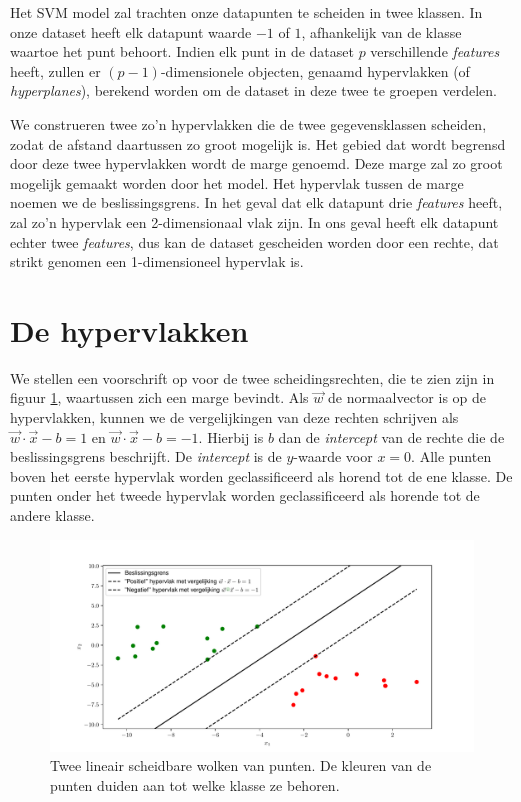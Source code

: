 \documentclass[twoside, kulak]{kulakreport}
\begin{document}
	Het SVM model zal trachten onze datapunten te scheiden in twee klassen. In onze dataset heeft elk datapunt waarde \(-1\) of \(1\), afhankelijk van de klasse waartoe het punt behoort. Indien elk punt in de dataset \(p\) verschillende \textit{features} heeft, zullen er \((p-1)\)-dimensionele objecten, genaamd hypervlakken (of \textit{hyperplanes}), berekend worden om de dataset in deze twee te groepen verdelen. 
	
	We construeren twee zo'n hypervlakken die de twee gegevensklassen scheiden, zodat de afstand daartussen zo groot mogelijk is. Het gebied dat wordt begrensd door deze twee hypervlakken wordt de marge genoemd. Deze marge zal zo groot mogelijk gemaakt worden door het model. Het hypervlak tussen de marge noemen we de beslissingsgrens.
	In het geval dat elk datapunt drie \textit{features} heeft, zal zo'n hypervlak een 2-dimensionaal vlak zijn. In ons geval heeft elk datapunt echter twee \textit{features}, dus kan de dataset gescheiden worden door een rechte, dat strikt genomen een 1-dimensioneel hypervlak is.
	
	\section{De hypervlakken}
	
	We stellen een voorschrift op voor de twee scheidingsrechten, die te zien zijn in figuur \ref{fig:svm}, waartussen zich een marge bevindt. Als \(\vec{w}\) de normaalvector is op de hypervlakken, kunnen we de vergelijkingen van deze rechten schrijven als \(\vec{w}\cdot \vec{x}-b=1\) en \(\vec{w}\cdot \vec{x}-b=-1\). Hierbij is \(b\) dan de \textit{intercept} van de rechte die de beslissingsgrens beschrijft. De \textit{intercept} is de \(y\)-waarde voor \(x=0\). Alle punten boven het eerste hypervlak worden geclassificeerd als horend tot de ene klasse. De punten onder het tweede hypervlak worden geclassificeerd als horende tot de andere klasse.
	
	\begin{figure}[h!]
		\centering
		\includegraphics[width=.7\textwidth]{svm-afbeelding}
		\caption{Twee lineair scheidbare wolken van punten. De kleuren van de punten duiden aan tot welke klasse ze behoren.}
		\label{fig:svm}
	\end{figure}
	
\end{document}

